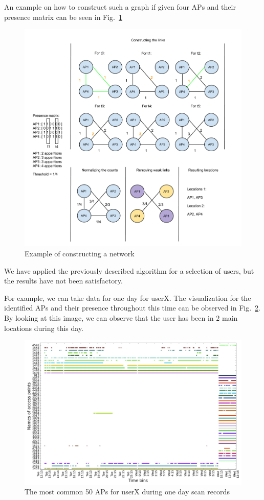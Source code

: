 An example on how to construct such a graph if given four APs and their
presence matrix can be seen in Fig.~\ref{network_calc_example}

\begin{figure}[!h]
\centering
\includegraphics[width=1\textwidth]{figures/networks/net_constr_ex.png}
\caption{Example of constructing a network}
\label{network_calc_example}
\end{figure}

We have applied the previously described algorithm for a selection of users, but
the results have not been satisfactory.

For example, we can take data for one day for userX. The visualization for the
identified APs and their presence throughout this time can be observed in
Fig.~\ref{user_6_pres_1d}. By looking at this image, we can observe that the
user has been in $2$ main locations during this day.

\begin{figure}[!h]
\centering
\includegraphics[width=\textwidth]{figures/networks/user_6_sorted_1days_no_rssi_plot.png}
\caption{The most common 50 APs for userX during one day scan records}
\label{user_6_pres_1d}
\end{figure}

